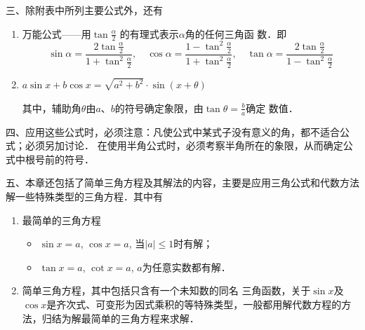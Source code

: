 三、除附表中所列主要公式外，还有
\begin{enumerate}
    \item 万能公式——用$\tan\frac{\alpha}{2}$
的有理式表示$\alpha$角的任何三角函
数．即
\[\sin\alpha=\frac{2\tan\frac{\alpha}{2}}{1+\tan^2\frac{\alpha}{2}},\quad \cos\alpha=\frac{1-\tan^2\frac{\alpha}{2}}{1+\tan^2\frac{\alpha}{2}},\quad \tan\alpha=\frac{2\tan\frac{\alpha}{2}}{1-\tan^2\frac{\alpha}{2}} \]

\item $a\sin x+b\cos x=\sqrt{a^2+b^2}\cdot \sin(x+\theta)$

其中，辅助角$\theta$由$a$、$b$的符号确定象限，由$\tan\theta=\frac{b}{a}$确定
数值．
\end{enumerate}

四、应用这些公式时，必须注意：凡使公式中某式子没有意义的角，都不适合公式；必须另加讨论．
在使用半角公式时，必须考察半角所在的象限，从而确定公式中根号前的符号．

五、本章还包括了简单三角方程及其解法的内容，主要是应用三角公式和代数方法解一些特殊类型的三角方程．其中有
\begin{enumerate}
    \item 最简单的三角方程
    \begin{itemize}
        \item $\sin x=a$, $\cos x=a$, 当$|a|\le 1$时有解；
        \item $\tan x=a$, $\cot x=a$, $a$为任意实数都有解．
    \end{itemize}

\item 简单三角方程，其中包括只含有一个未知数的同名
三角函数，关于$\sin x$及$\cos x$是齐次式、可变形为因式乘积的等特殊类型，一般都用解代数方程的方法，归结为解最简单的三角方程来求解．
\end{enumerate}

